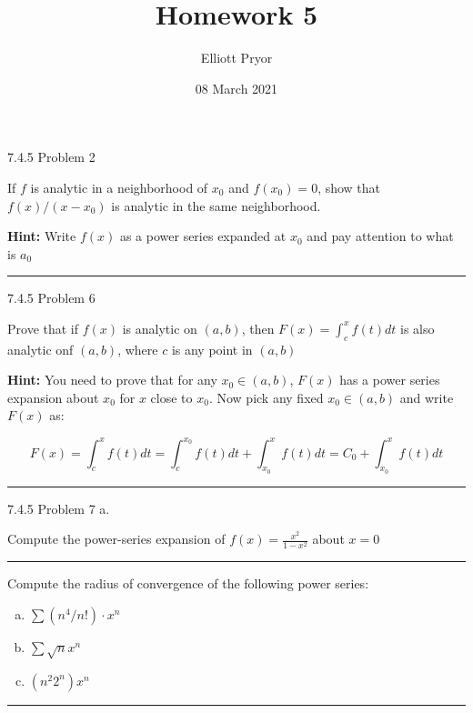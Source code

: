 \documentclass[11pt]{article}
\title{Homework 5}
\author{Elliott Pryor}
\date{08 March 2021}
\begin{document}
\maketitle

 7.4.5 Problem 2

If $f$ is analytic in a neighborhood of $x_0$ and $f(x_0) = 0$, 
show that $f(x)/(x - x_0)$ is analytic in the same neighborhood.

\textbf{Hint:} Write $f(x)$ as a power series expanded at $x_0$ and pay attention to what is $a_0$

\hrule








 7.4.5 Problem 6

Prove that if $f(x)$ is analytic on $(a,b)$, then $F(x) = \int_c ^x f(t)dt$ 
is also analytic onf $(a,b)$, where $c$ is any point in $(a,b)$

\textbf{Hint:} You need to prove that for any $x_0 \in (a,b)$, $F(x)$ has
a power series expansion about $x_0$ for $x$ close to $x_0$.
Now pick any fixed $x_0 \in (a,b)$ and write $F(x)$ as:

$$F(x) = \int_c ^x f(t) dt = \int_c ^{x_0} f(t) dt + \int_{x_0} ^x f(t) dt = C_0 + \int_{x_0} ^x f(t)dt$$

\hrule








 7.4.5 Problem 7 a.

Compute the power-series expansion of $f(x) = \frac{x^2}{1-x^2}$ about $x=0$

\hrule








Compute the radius of convergence of the following power series:

\begin{enumerate}[a.]
    \item $\sum (n^4/n!) \cdot x^n$
    \item $\sum \sqrt{n} x^n$
    \item $(n^2 2^n) x^n$
\end{enumerate}

\hrule
\end{document}
